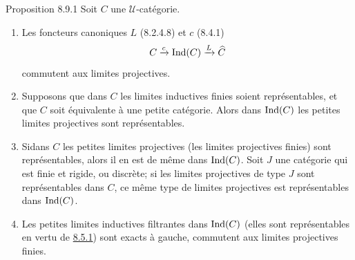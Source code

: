 \documentclass[10pt]{../fichiers-configuration-latex/smfart}
\def\labelenumi{(\theenumi)}
\begin{document}
\begin{enonce*}{Proposition 8.9.1}
Soit $C$ une $𝒰$-catégorie.
\begin{enumerate}
\renewcommand{\theenumi}{\alph{enumi}}
\renewcommand{\labelenumi}{\theenumi)}
\item Les foncteurs canoniques $L$ (8.2.4.8) et $c$ (8.4.1)
$$
C\xrightarrow{c}\operatorname{Ind}(C)\xrightarrow{L}\widehat{C}
$$
commutent aux limites projectives.

\item Supposons que dans $C$ les limites inductives finies soient
représentables, et que $C$ soit équivalente à une petite
catégorie.
Alors dans $\operatorname{Ind}(C)$ les petites limites projectives sont
représentables.

\item Si\pageoriginale dans $C$ les petites limites projectives
(\resp les limites projectives finies) sont représentables, alors il
en est de même dans $\operatorname{Ind}(C)$. Soit $J$ une catégorie qui est finie
et rigide, ou discrète; si les limites projectives de type $J$ sont
représentables dans $C$, ce même type de limites projectives est
représentables dans $\operatorname{Ind}(C)$.

\item Les petites limites inductives filtrantes dans $\operatorname{Ind}(C)$ (elles
sont représentables en vertu de \hyperref[I.prop8.5.1]{8.5.1}) sont exacts à
gauche, \ie commutent aux limites projectives finies.
\end{enumerate}
\end{enonce*}
\end{document}
